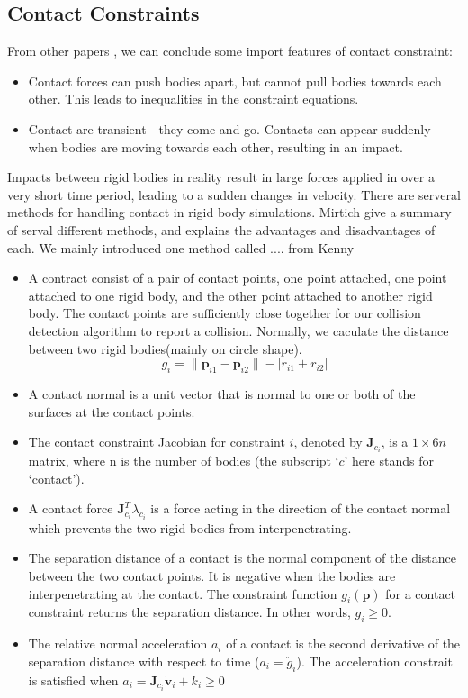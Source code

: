     \subsection{Contact Constraints}
        From other papers \cite{bender2014interactive}, we can conclude some import features of contact constraint:
        \begin{itemize}
            \item Contact forces can push bodies apart, but cannot pull bodies towards each other. This leads to inequalities in the constraint equations.
            \item Contact are transient - they come and go. Contacts can appear suddenly when bodies are moving towards each other, resulting in an impact.
        \end{itemize}
        Impacts between rigid bodies in reality result in large forces applied in over a very short time period, leading to a sudden changes in velocity. There are serveral methods for handling contact in rigid body simulations. Mirtich\cite{mirtich1998rigid} give a summary of serval different methods, and explains the advantages and disadvantages of each. We mainly introduced one  method called .... from Kenny\cite{erleben2017rigid}
        \begin{itemize}
            \item A contract consist of a pair of contact points, one point attached, one point attached to one rigid body, and the other point attached to another rigid body. The contact points are sufficiently close together for our collision detection algorithm to report a collision. Normally, we caculate the distance between two rigid bodies(mainly on circle shape).
            \begin{equation}
                g_i = \|\pmb{p}_{i1} - \pmb{p}_{i2}\| - |r_{i1} + r_{i2}|
            \end{equation}
            \item A contact normal is a unit vector that is normal to one or both of the surfaces at the contact points.
            \item The contact constraint Jacobian for constraint $i$, denoted by $\pmb{J}_{c_i}$, is a $1\times 6n$ matrix, where n is the number of bodies (the subscript `$c$' here stands for `contact').
            \item A contact force $\pmb{J}_{c_i}^{T}\lambda _{c_i}$ is a force acting in the direction of the contact normal which prevents the two rigid bodies from interpenetrating.
            \item The separation distance of a contact is the normal component of the distance between the two contact points. It is negative when the bodies are interpenetrating at the contact. The constraint function $g_{i}(\pmb{p})$ for a contact constraint returns the separation distance. In other words, $g_i \ge 0$.
            \item The relative normal acceleration $a_i$ of a contact is the second derivative of the separation distance with respect to time ($a_i = \ddot{g}_i$). The acceleration constrait is satisfied when $a_i = \pmb{J}_{c_i} \dot{\mathbf{v}}_i+ k_i \ge 0$
        \end{itemize}
